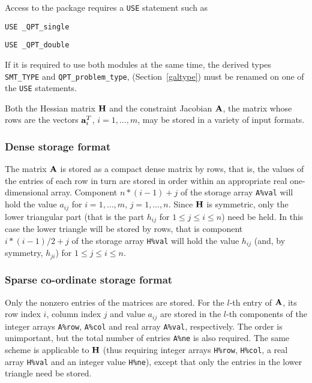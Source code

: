 \documentclass{galahad}
\newcommand{\packagename}{QPT}
\newcommand{\fullpackagename}{\libraryname\_\packagename}
\begin{document}
Access to the package requires a {\tt USE} statement such as

\medskip{}

\hspace{8mm} {\tt USE \fullpackagename\_single}

\medskip{}

\hspace{8mm} {\tt USE  \fullpackagename\_double}

\medskip

\noindent
If it is required to use both modules at the same time, the derived types
{\tt SMT\_TYPE}
and
{\tt QPT\_problem\_type},
(Section~\ref{galtype})
must be renamed on one of the {\tt USE} statements.


\galmatrix
Both the Hessian matrix ${\mathbf{H}}$ and
the constraint Jacobian ${\mathbf{A}}$, the matrix
whose rows are the vectors ${\mathbf{a}}_{i}^{T}$, $i = 1, \ldots , m$,
may be stored in a variety of input formats.

\subsubsection{Dense storage format}\label{dense}
The matrix ${\mathbf{A}}$ is stored as a compact
dense matrix by rows, that is, the values of the entries of each row in turn are
stored in order within an appropriate real one-dimensional array.
Component $n \ast (i-1) + j$ of the storage array {\tt A\%val} will hold the
value $a_{ij}$ for $i = 1, \ldots , m$, $j = 1, \ldots , n$.
Since ${\mathbf{H}}$ is symmetric, only the lower triangular part (that is the part
$h_{ij}$ for $1 \leq j \leq i \leq n$) need be held. In this case
the lower triangle will be stored by rows, that is
component $i \ast (i-1)/2 + j$ of the storage array {\tt H\%val}
will hold the value $h_{ij}$ (and, by symmetry, $h_{ji}$)
for $1 \leq j \leq i \leq n$.

\subsubsection{Sparse co-ordinate storage format}\label{coordinate}
Only the nonzero entries of the matrices are stored. For the
$l$-th entry of ${\mathbf{A}}$, its row index $i$, column index $j$
and value $a_{ij}$
are stored in the $l$-th components of the integer arrays {\tt A\%row},
{\tt A\%col} and real array {\tt A\%val}, respectively.
The order is unimportant, but the total
number of entries {\tt A\%ne} is also required.
The same scheme is applicable to
${\mathbf{H}}$ (thus requiring integer arrays {\tt H\%row}, {\tt H\%col}, a real array
{\tt H\%val} and an integer value {\tt H\%ne}),
except that only the entries in the lower triangle need be stored.
\end{document}
